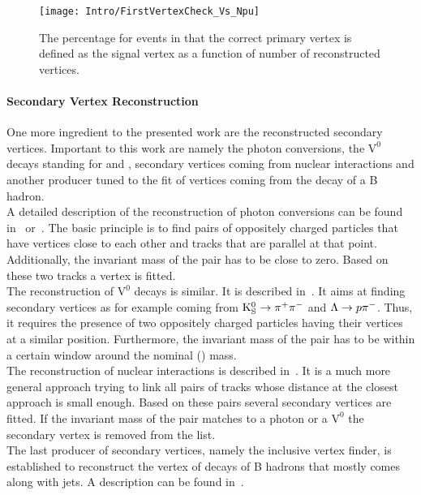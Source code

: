 \begin{figure}[Htb]
    \centering
    \texttt{[image: Intro/FirstVertexCheck\_Vs\_Npu]}
    \caption[Probability to define the correct vertex as signal]{The percentage for events in that the correct primary vertex is defined as the signal vertex as a function of number of reconstructed vertices. \label{plot:IntroSigVertexProb}}
\end{figure}

\paragraph*{Secondary Vertex Reconstruction}

One more ingredient to the presented work are the reconstructed secondary vertices. Important to this work are namely the photon conversions, the $\text{V}^{\text{0}}$ decays standing for \PKzS{} and \PgL{}, secondary vertices coming from nuclear interactions and another producer tuned to the fit of vertices coming from the decay of a B hadron. \\
A detailed description of the reconstruction of photon conversions can be found in~\cite{GiordanoConversion} or~\cite{CMS-PAS-EGM-10-005}. The basic principle is to find pairs of oppositely charged particles that have vertices close to each other and tracks that are parallel at that point. Additionally, the invariant mass of the pair has to be close to zero. Based on these two tracks a vertex is fitted. \\
The reconstruction of $\text{V}^{\text{0}}$ decays is similar. It is described in~. It aims at finding secondary vertices as for example coming from $\mathrm{K}^0_\mathrm{S}{} \rightarrow{} \pi{}^{+}{}\pi{}^{-}{}$ and $\Lambda{}{} \rightarrow{} p\pi{}^{-}{}$. Thus, it requires the presence of two oppositely charged particles having their vertices at a similar position. Furthermore, the invariant mass of the pair has to be within a certain window around the nominal \PKzS{} (\PgL{}) mass. \\
The reconstruction of nuclear interactions is described in~. It is a much more general approach trying to link all pairs of tracks whose distance at the closest approach is small enough. Based on these pairs several secondary vertices are fitted. If the invariant mass of the pair matches to a photon or a $\text{V}^{\text{0}}$ the secondary vertex is removed from the list. \\
The last producer of secondary vertices, namely the inclusive vertex finder, is established to reconstruct the vertex of decays of B hadrons that mostly comes along with jets. A description can be found in~.


